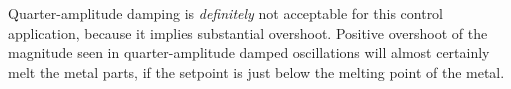 





Quarter-amplitude damping is {\it definitely} not acceptable for this control application, because it implies substantial overshoot.  Positive overshoot of the magnitude seen in quarter-amplitude damped oscillations will almost certainly melt the metal parts, if the setpoint is just below the melting point of the metal.




